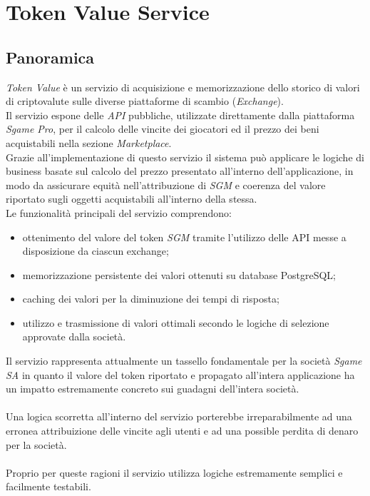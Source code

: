 \documentclass[11pt]{thesistemp}
\begin{document}
\section{Token Value Service}

\subsection{Panoramica}

\textit{Token Value} è un servizio di acquisizione e memorizzazione dello storico di valori di criptovalute sulle diverse piattaforme di scambio (\textit{Exchange}).\\
Il servizio espone delle \textit{API} pubbliche, utilizzate direttamente dalla piattaforma \textit{Sgame Pro}, per il calcolo delle vincite dei giocatori ed il prezzo dei beni acquistabili nella sezione \textit{Marketplace}. \\
Grazie all'implementazione di questo servizio il sistema può applicare le logiche di business basate sul calcolo del prezzo presentato all'interno dell'applicazione, in modo da assicurare equità nell'attribuzione di \textit{SGM} e coerenza del valore riportato sugli oggetti acquistabili all'interno della stessa.\\
Le funzionalità principali del servizio comprendono:
\begin{itemize}
	\item ottenimento del valore del token \textit{SGM} tramite l'utilizzo delle API messe a disposizione da ciascun exchange;
	\item memorizzazione persistente dei valori ottenuti su database PostgreSQL;
	\item caching dei valori per la diminuzione dei tempi di risposta;
	\item utilizzo e trasmissione di valori ottimali secondo le logiche di selezione approvate dalla società.
\end{itemize}
Il servizio rappresenta attualmente un tassello fondamentale per la società \textit{Sgame SA} in quanto il valore del token riportato e propagato all'intera applicazione ha un impatto estremamente concreto sui guadagni dell'intera società.\\\\
Una logica scorretta all'interno del servizio porterebbe irreparabilmente ad una erronea attribuizione delle vincite agli utenti e ad una possible perdita di denaro per la società.\\\\
Proprio per queste ragioni il servizio utilizza logiche estremamente semplici e facilmente testabili.
\pagebreak
\end{document}
